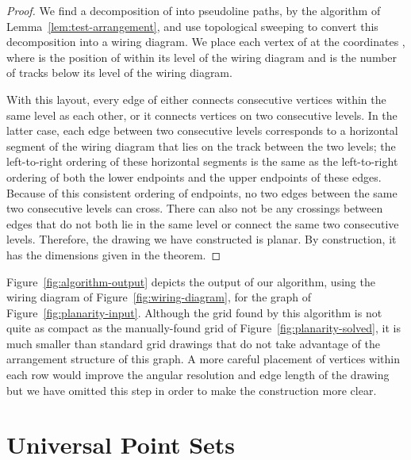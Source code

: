 \documentclass[oribibl]{llncs}
\begin{document}
\begin{proof}
We find a decomposition of  into pseudoline paths, by the algorithm of Lemma~\ref{lem:test-arrangement}, and use topological sweeping to convert this decomposition into a wiring diagram. We place each vertex  of  at the coordinates , where  is the position of  within its level of the wiring diagram and  is the number of tracks below its level of the wiring diagram.

With this layout, every edge of  either connects consecutive vertices within the same level as each other, or it connects vertices on two consecutive levels. In the latter case, each edge between two consecutive levels corresponds to a horizontal segment of the wiring diagram that lies on the track between the two levels; the left-to-right ordering of these horizontal segments is the same as the left-to-right ordering of both the lower endpoints and the upper endpoints of these edges. Because of this consistent ordering of endpoints, no two edges between the same two consecutive levels can cross. There can also not be any crossings between edges that do not both lie in the same level or connect the same two consecutive levels. Therefore, the drawing we have constructed is planar. By construction, it has the dimensions given in the theorem.
\end{proof}

Figure~\ref{fig:algorithm-output} depicts the output of our algorithm, using the wiring diagram of Figure~\ref{fig:wiring-diagram}, for the graph of Figure~\ref{fig:planarity-input}.
Although the  grid found by this algorithm is not quite as compact as the manually-found  grid of Figure~\ref{fig:planarity-solved}, it is much smaller than standard grid drawings that do not take advantage of the arrangement structure of this graph. A more careful placement of vertices within each row would improve the angular resolution and edge length of the drawing but we have omitted this step in order to make the construction more clear.

\section{Universal Point Sets}
\end{document}
